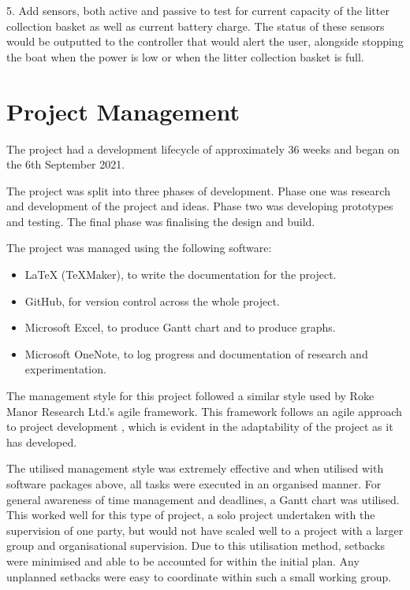 \documentclass [12pt]{article}
\begin{document}
5.	Add sensors, both active and passive to test for current capacity of the litter collection basket as well as current battery charge. The status of these sensors would be outputted to the controller that would alert the user, alongside stopping the boat when the power is low or when the litter collection basket is full.  

\section{Project Management}

The project had a development lifecycle of approximately 36 weeks and began on the 6th September 2021.

The project was split into three phases of development. Phase one was research and development of the project and ideas. Phase two was developing prototypes and testing. The final phase was finalising the design and build. 

The project was managed using the following software: 

\begin{itemize}

\item{LaTeX (TeXMaker), to write the documentation for the project.}
\item{GitHub, for version control across the whole project.}
\item{Microsoft Excel, to produce Gantt chart and to produce graphs.}
\item{Microsoft OneNote, to log progress and documentation of research and experimentation.}

\end{itemize}

The management style for this project followed a similar style used by Roke Manor Research Ltd.'s agile framework. This framework follows an agile approach to project development \cite{agile_development}, which is evident in the adaptability of the project as it has developed.  

The utilised management style was extremely effective and when utilised with software packages above, all tasks were executed in an organised manner. For general awareness of time management and deadlines, a Gantt chart was utilised. This worked well for this type of project, a solo project undertaken with the supervision of one party, but would not have scaled well to a project with a larger group and organisational supervision. Due to this utilisation method, setbacks were minimised and able to be accounted for within the initial plan. Any unplanned setbacks were easy to coordinate within such a small working group. 
\end{document}

